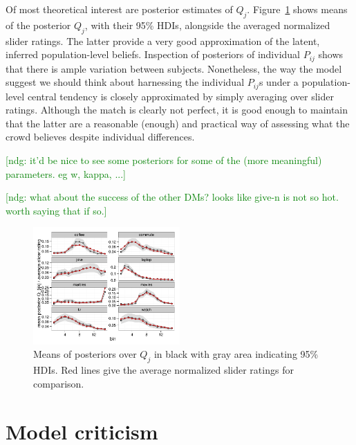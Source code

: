 \documentclass[10pt,letterpaper]{article}
\newcommand{\ndg}[1]{\textcolor{Green}{[ndg: #1]}}
\begin{document}
Of most theoretical interest are posterior estimates of $Q_j$. Figure~\ref{fig:PosteriorQj}
shows means of the posterior $Q_j$, with their 95\% HDIs, alongside the averaged normalized
slider ratings. The latter provide a very good approximation of the latent, inferred
population-level beliefs. Inspection of posteriors of individual $P_{ij}$ shows that there is
ample variation between subjects. Nonetheless, the way the model suggest we should think about
harnessing the individual $P_{ij}$s under a population-level central tendency is closely
approximated by simply averaging over slider ratings. Although the match is clearly not
perfect, it is good enough to maintain that the latter are a reasonable (enough) and practical
way of assessing what the crowd believes despite individual differences.

\ndg{it'd be nice to see some posteriors for some of the (more meaningful) parameters. eg w, kappa, ...}

\ndg{what about the success of the other DMs? looks like give-n is not so hot. worth saying that if so.}

\begin{figure}
  \centering
  \includegraphics[width = 0.5\textwidth]{plots/pop_priors.pdf}
  \caption{Means of posteriors over $Q_j$ in black with gray area indicating 95\% HDIs. Red
    lines give the average normalized slider ratings for comparison.}
  \label{fig:PosteriorQj}
\end{figure}

\section{Model criticism}
\end{document}
